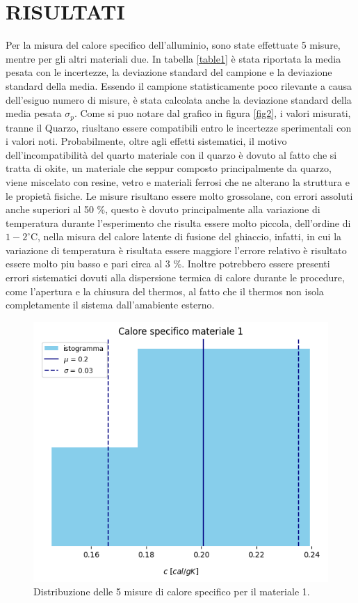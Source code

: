 \documentclass{article_saj}
\begin{document}
\section{RISULTATI}
Per la misura del calore specifico dell'alluminio, sono state effettuate 5 misure, mentre per gli altri materiali due.
In tabella \ref{table1} è stata riportata la media pesata con le incertezze, la deviazione standard del campione e la deviazione standard  della media.
Essendo il campione statisticamente poco rilevante a causa dell'esiguo numero di misure, è stata calcolata anche
la deviazione standard della media pesata $\sigma_p$.
Come si puo notare dal grafico in figura \ref{fig2}, 
i valori misurati, tranne il Quarzo, riusltano essere compatibili entro le incertezze sperimentali con i valori noti. Probabilmente,
oltre agli effetti sistematici, il motivo dell'incompatibilità del quarto materiale con il quarzo è dovuto al fatto che si tratta di okite, un
materiale che seppur composto principalmente da quarzo, viene miscelato con resine, vetro e materiali ferrosi che ne alterano la struttura e le propietà fisiche.
Le misure risultano essere molto grossolane, con errori assoluti anche superiori al 50 \%, questo è dovuto principalmente alla variazione di temperatura
durante l'esperimento che risulta essere molto piccola, dell'ordine di $1-2 ^\circ\text{C}$, nella misura del calore latente di fusione del ghiaccio, infatti, in cui la variazione 
di temperatura è risultata essere maggiore l'errore relativo è risultato essere molto piu basso e pari circa al 3 \%. Inoltre potrebbero essere presenti
errori sistematici dovuti alla dispersione termica di calore durante le procedure, come l'apertura e la chiusura del thermos, al fatto che il thermos non 
isola completamente il sistema dall'amabiente esterno.





\begin{figure}[ht]
     \centerline{\includegraphics[width=0.9\columnwidth, keepaspectratio]{distribuzione_cs_alluminio.png}}
     \caption{Distribuzione delle 5 misure di calore specifico per il materiale 1.}
     \label{fig1}
\end{figure}
\end{document}
